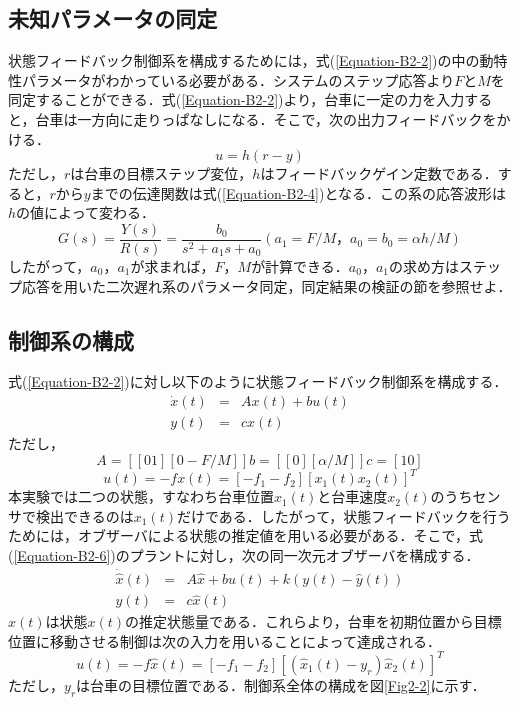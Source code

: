 \documentclass[12pt]{jsarticle}
\begin{document}
\subsection{未知パラメータの同定}
状態フィードバック制御系を構成するためには，式(\ref{Equation-B2-2})の中の動特性パラメータがわかっている必要がある．システムのステップ応答より$F$と$M$を同定することができる．式(\ref{Equation-B2-2})より，台車に一定の力を入力すると，台車は一方向に走りっぱなしになる．そこで，次の出力フィードバックをかける．
\begin{equation}
  \label{Equation-B2-3}
  u = h(r - y)
\end{equation}
ただし，$r$は台車の目標ステップ変位，$h$はフィードバックゲイン定数である．すると，$r$から$y$までの伝達関数は式(\ref{Equation-B2-4})となる．この系の応答波形は$h$の値によって変わる．
\begin{equation}
  \label{Equation-B2-4}
  G(s) = \frac{Y(s)}{R(s)} = \frac{b_0}{s^2+a_1s+a_0} (a_1 =F/M，a_0=b_0=\alpha h /M)
\end{equation}
したがって，$a_0$，$a_1$が求まれば，$F$，$M$が計算できる．$a_0$，$a_1$の求め方はステップ応答を用いた二次遅れ系のパラメータ同定，同定結果の検証の節を参照せよ．
\subsection{制御系の構成}
式(\ref{Equation-B2-2})に対し以下のように状態フィードバック制御系を構成する．
\begin{eqnarray}
  \label{Equation-B2-5}
  \dot{x}(t) &=& Ax(t) + bu(t) \\
  \label{Equation-B2-6}
  y(t) &=& cx(t)
\end{eqnarray}
ただし，
\begin{equation}
  \label{Equation-B2-7}
  A = \left[ [0 1] [0 -F/M]\right] b = \left[ [0] [\alpha/M]\right] c = [1 0]
\end{equation}
\begin{equation}
  \label{Equation-B2-8}
  u(t) = -fx(t) = [-f_1 -f_2][x_1(t) x_2(t)]^T
\end{equation}
本実験では二つの状態，すなわち台車位置$x_1(t)$と台車速度$x_2(t)$のうちセンサで検出できるのは$x_1(t)$だけである．したがって，状態フィードバックを行うためには，オブザーバによる状態の推定値を用いる必要がある．そこで，式(\ref{Equation-B2-6})のプラントに対し，次の同一次元オブザーバを構成する．
\begin{eqnarray}
  \label{Equation-B2-9}
  \dot{\hat{x}}(t) &=& A \hat{x} + bu(t) + k(y(t) - \hat{y}(t)) \\
  \label{Equation-B2-10}
  \hat{y}(t) &=& c\hat{x}(t)
\end{eqnarray}
$\hat{x}(t)$は状態$x(t)$の推定状態量である．これらより，台車を初期位置から目標位置に移動させる制御は次の入力を用いることによって達成される．
\begin{equation}
  \label{Equation-B2-11}
  u(t) = -f \hat{x}(t) = [ -f_1 -f_2][(\hat{x}_1 (t) - y_r) \hat{x}_2(t)]^T
\end{equation}
ただし，$y_r$は台車の目標位置である．制御系全体の構成を図\ref{Fig2-2}に示す．
\end{document}
